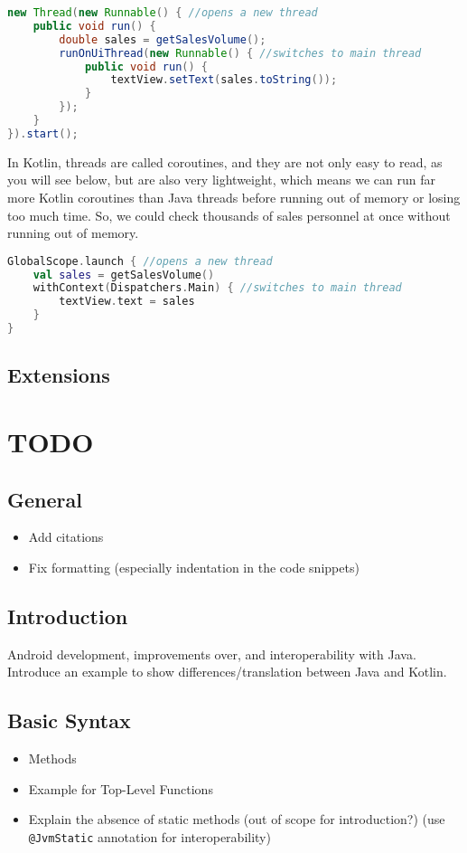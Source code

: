 \documentclass[a4paper, 11pt]{article}
\begin{document}
\begin{lstlisting}[language = Java, title = Java Background Threads]
new Thread(new Runnable() { //opens a new thread
    public void run() {
        double sales = getSalesVolume();
        runOnUiThread(new Runnable() { //switches to main thread
            public void run() {
                textView.setText(sales.toString());
            }
        });
    }
}).start();
\end{lstlisting}
In Kotlin, threads are called coroutines, and they are not only easy to read, as you will see below, but are also very lightweight, which means we can run far more Kotlin coroutines than Java threads before running out of memory or losing too much time.
So, we could check thousands of sales personnel at once without running out of memory.
\begin{lstlisting}[language = Kotlin, title = Kotlin Coroutines]
GlobalScope.launch { //opens a new thread
    val sales = getSalesVolume() 
    withContext(Dispatchers.Main) { //switches to main thread
        textView.text = sales 
    }
}

\end{lstlisting}



 \subsection{Extensions}
\section{TODO}
\subsection{General}
  \begin{itemize}
    \item Add citations
    \item Fix formatting (especially indentation in the code snippets)
  \end{itemize}
\subsection{Introduction}
  Android development, improvements over, and interoperability with Java.
  Introduce an example to show differences/translation between Java and Kotlin.

\subsection{Basic Syntax}
\begin{itemize}
  \item Methods
  \item Example for Top-Level Functions
  \item Explain the absence of static methods (out of scope for introduction?) (use \texttt{@JvmStatic} annotation for interoperability)
\end{itemize}
\end{document}
